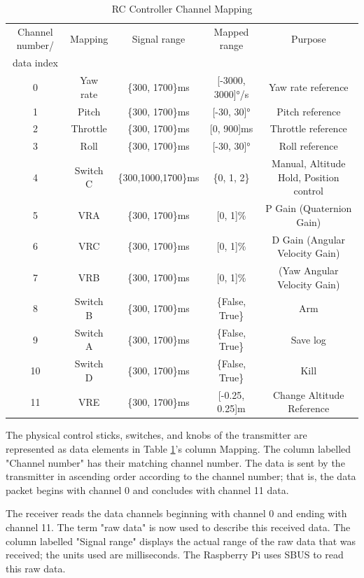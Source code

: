 \documentclass{article}
\begin{document}
\begin{table}[h]
  \centering
  \begin{tabular}{|c|c|c|c|c|}
    \hline
    Channel number/ & Mapping & Signal range & Mapped range & Purpose \\
    data index & & & & \\
    \hline
    0 & Yaw rate & \{300, 1700\}ms & [-3000, 3000]°/s & Yaw rate reference \\
    1 & Pitch & \{300, 1700\}ms & [-30, 30]° & Pitch reference \\
    2 & Throttle & \{300, 1700\}ms & [0, 900]ms & Throttle reference \\
    3 & Roll & \{300, 1700\}ms & [-30, 30]° & Roll reference \\
    4 & Switch C & \{300,1000,1700\}ms & \{0, 1, 2\} & Manual, Altitude Hold,
    Position control \\
    5 & VRA & \{300, 1700\}ms & [0, 1]\% & P Gain (Quaternion Gain) \\
    6 & VRC & \{300, 1700\}ms & [0, 1]\% & D Gain (Angular Velocity Gain) \\
    7 & VRB & \{300, 1700\}ms & [0, 1]\% & (Yaw Angular Velocity Gain)\\
    8 & Switch B & \{300, 1700\}ms & \{False, True\} & Arm \\
    9 & Switch A & \{300, 1700\}ms & \{False, True\} & Save log \\
    10 & Switch D & \{300, 1700\}ms & \{False, True\} & Kill \\
    11 & VRE & \{300, 1700\}ms & [-0.25, 0.25]m & Change Altitude Reference\\
    \hline
  \end{tabular}
  \caption{RC Controller Channel Mapping}
  \label{figure:RC_Controller_Channel_Mapping}
\end{table}

The physical control sticks, switches, and knobs of the transmitter are
represented as data elements in Table
\ref{figure:RC_Controller_Channel_Mapping}'s column Mapping. The column labelled
"Channel number" has their matching channel number. The data is sent by the
transmitter in ascending order according to the channel number; that is, the
data packet begins with channel 0 and concludes with channel 11 data.

The receiver reads the data channels beginning with channel 0 and ending with
channel 11. The term "raw data" is now used to describe this received data. The
column labelled "Signal range" displays the actual range of the raw data that
was received; the units used are milliseconds. The Raspberry Pi uses SBUS to
read this raw data.
\end{document}
